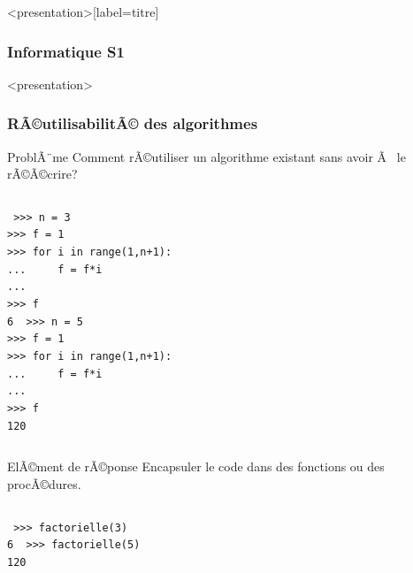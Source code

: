 
\begin{frame}<presentation>[label=titre]
\frametitle{Informatique \hfill {S1}}
\titlepage

\end{frame}


\begin{frame}<presentation>
\frametitle{RÃ©utilisabilitÃ© des algorithmes}
\begin{block}{ProblÃ¨me}
Comment rÃ©utiliser un algorithme existant sans avoir Ã  le rÃ©Ã©crire?
\end{block}
\pause

\begin{columns}[T]
\column{5cm}\footnotesize\tt
>>> n = 3\\
>>> f = 1\\
>>> for i in range(1,n+1):\\
...\ \ \ \ \ f = f*i\\
...\\
>>> f\\
6
\pause
\column{5cm}\footnotesize\tt
>>> n = 5\\
>>> f = 1\\
>>> for i in range(1,n+1):\\
...\ \ \ \ \ f = f*i\\
...\\
>>> f\\
120
\end{columns}
\pause
\begin{block}{ElÃ©ment de rÃ©ponse}
Encapsuler le code dans des fonctions ou des procÃ©dures.
\end{block}
\pause
\begin{columns}[T]
\column{5cm}\footnotesize\tt
>>> \alert{factorielle(}3\alert{)}\\
6
\pause
\column{5cm}\footnotesize\tt
>>> \alert{factorielle(}5\alert{)}\\
120
\end{columns}

\end{frame}


